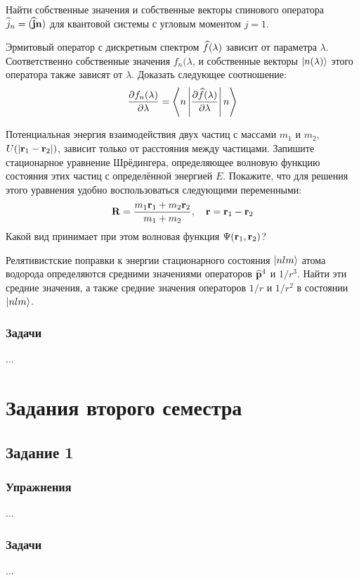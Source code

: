 \begin{exercise}
%
\item\label{ex:1_2_9}%
Найти собственные значения и собственные векторы спинового оператора $\widehat{j}_n = (\widehat{\mathbf{j}}\mathbf{n})$ для квантовой системы с угловым моментом $j=1$.
%
\item\label{ex:1_2_10}%
Эрмитовый оператор с дискретным спектром $\widehat{f}(\lambda)$ зависит от параметра $\lambda$. Соответственно собственные значения $f_n(\lambda$, и собственные векторы $\left|{n(\lambda)}\right\rangle$ этого оператора также зависят от $\lambda$. Доказать следующее соотношение:
$$
\frac{\partial{f_n(\lambda)}}{\partial{\lambda}} =
  \left\langle{n}\left|{\frac{\partial{\widehat{f}(\lambda)}}{\partial{\lambda}}}\right|{n}\right\rangle
$$
%
\item\label{ex:1_2_11}%
Потенциальная энергия взаимодействия двух частиц с массами $m_1$ и $m_2$, $U(\left\lvert{\mathbf{r}_1 - \mathbf{r}_2}\right\rvert)$, зависит только от расстояния между частицами. Запишите стационарное уравнение Шрёдингера, определяющее волновую функцию состояния этих частиц с определённой энергией $E$. Покажите, что для решения этого уравнения удобно воспользоваться следующими переменными:
$$
\mathbf{R} = \frac{m_1 \mathbf{r}_1 + m_2 \mathbf{r}_2}{m_1 + m_2},~~~
\mathbf{r} = \mathbf{r}_1 - \mathbf{r}_2
$$%
%
Какой вид принимает при этом волновая функция $\Psi(\mathbf{r}_1, \mathbf{r}_2)$?
%
\item\label{ex:1_2_12}%
Релятивистские поправки к энергии стационарного состояния $\left|{nlm}\right\rangle$ атома водорода определяются средними значениями операторов $\widehat{\mathbf{p}}^4$ и $1/r^3$. Найти эти средние значения, а также средние значения операторов $1/r$ и $1/r^2$ в состоянии $\left|{nlm}\right\rangle$.
\end{exercise}

\subsection*{\hfil Задачи \hfil}
%
\begin{problem}
\item ...
\end{problem}



\chapter{Задания второго семестра}

\section{Задание 1}

\subsection*{\hfil Упражнения \hfil}
%
\begin{exercise}
\item ...
\end{exercise}

\subsection*{\hfil Задачи \hfil}
%
\begin{problem}
\item ...
\end{problem}